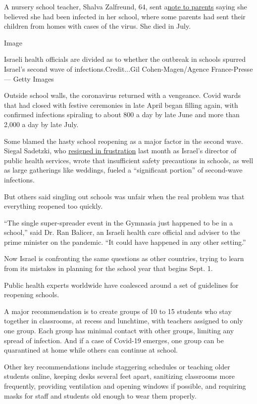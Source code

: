 A nursery school teacher, Shalva Zalfreund, 64, sent
a\href{https://www.facebook.com/photo.php?fbid=2694147267485782\&set=a.1636227159944470\&type=3\&theater}{note
to parents} saying she believed she had been infected in her school,
where some parents had sent their children from homes with cases of the
virus. She died in July.

Image

Israeli health officials are divided as to whether the outbreak in
schools spurred Israel's second wave of infections.Credit...Gil
Cohen-Magen/Agence France-Presse --- Getty Images

Outside school walls, the coronavirus returned with a vengeance. Covid
wards that had closed with festive ceremonies in late April began
filling again, with confirmed infections spiraling to about 800 a day by
late June and more than 2,000 a day by late July.

Some blamed the hasty school reopening as a major factor in the second
wave. Siegal Sadetzki, who
\href{https://www.timesofisrael.com/top-health-ministry-official-quits-warns-israel-heading-down-dangerous-path/}{resigned
in frustration} last month as Israel's director of public health
services, wrote that insufficient safety precautions in schools, as well
as large gatherings like weddings, fueled a ``significant portion'' of
second-wave infections.

But others said singling out schools was unfair when the real problem
was that everything reopened too quickly.

``The single super-spreader event in the Gymnasia just happened to be in
a school,'' said Dr. Ran Balicer, an Israeli health care official and
adviser to the prime minister on the pandemic. ``It could have happened
in any other setting.''

Now Israel is confronting the same questions as other countries, trying
to learn from its mistakes in planning for the school year that begins
Sept. 1.

Public health experts worldwide have coalesced around a set of
guidelines for reopening schools.

A major recommendation is to create groups of 10 to 15 students who stay
together in classrooms, at recess and lunchtime, with teachers assigned
to only one group. Each group has minimal contact with other groups,
limiting any spread of infection. And if a case of Covid-19 emerges, one
group can be quarantined at home while others can continue at school.

Other key recommendations include staggering schedules or teaching older
students online, keeping desks several feet apart, sanitizing classrooms
more frequently, providing ventilation and opening windows if possible,
and requiring masks for staff and students old enough to wear them
properly.


